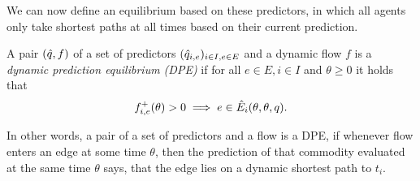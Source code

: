 We can now define an equilibrium based on these predictors, in which all agents only take shortest paths at all times based on their current prediction.
\begin{definition}
    A pair $(\hat q, f)$ of a set of predictors $(\hat q_{i,e})_{i\in I, e\in E}$ and a dynamic flow $f$ is a \emph{dynamic prediction equilibrium (DPE)} if for all $e\in E, i\in I$ and $\theta\geq 0$ it holds that
    \[
        {f}^+_{i,e}(\theta) > 0 \implies e \in \hat E_i(\theta, \theta, q).
    \]
\end{definition}

In other words, a pair of a set of predictors and a flow is a DPE, if whenever flow enters an edge at some time $\theta$, then the prediction of that commodity evaluated at the same time $\theta$ says, that the edge lies on a dynamic shortest path to $t_i$.

